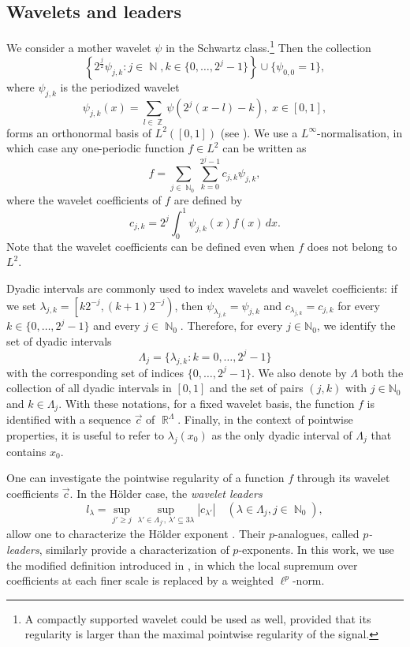 \documentclass[a4paper,11pt,oneside]{article}
\DeclareMathOperator{\R}{\mathbb{R}}
\DeclareMathOperator{\N}{\mathbb{N}}
\DeclareMathOperator{\Z}{\mathbb{Z}}
\newcommand{\coint}[1]{\left[{#1}\right)}
\newcommand{\ccint}[1]{\left[{#1}\right]}
\newcommand{\modu}[1]{\left\vert{#1}\right\vert}
\theoremstyle{definition}
\theoremstyle{plain}
\begin{document}
\subsection{Wavelets and leaders}\label{secWavelet}



We consider a mother wavelet $\psi$ in the Schwartz class.\footnote{A compactly supported wavelet could be used as well, provided that its regularity is larger than the maximal pointwise regularity of the signal.} Then the collection
\[
\left\{2^{\frac{j}{2}}\psi_{j,k} :j\in\N,k\in\{0,\ldots,2^j-1\}\right\}\cup\{\psi_{0,0}=1\},
\]
where $\psi_{j,k}$ is the periodized wavelet
\[
\psi_{j,k}(x)=\sum_{l\in\Z}\psi\left(2^j(x-l)-k\right),\; x\in\ccint{0,1},
\]
forms an orthonormal basis of $L^2(\ccint{0,1})$ (see \cite{LM86,Daubechies:92}). We use a $L^\infty$-normalisation, in which case any one-periodic function $f \in  L^2$ can be written as
\[
f=\sum_{j\in\N_0}\sum_{k=0}^{2^j-1}c_{j,k}\psi_{j,k},
\]
where the wavelet coefficients of $f$ are defined by
\[
c_{j,k}=2^j\int_0^1\psi_{j,k}(x)f(x)\,dx.
\]
Note that the wavelet coefficients can be defined even when $f$ does not belong to $L^2$.

Dyadic intervals are commonly used to index wavelets and wavelet coefficients: if we set \mbox{$\lambda_{j,k}=\coint{k2^{-j},(k+1)2^{-j}}$}, then $\psi_{\lambda_{j,k}}=\psi_{j,k}$ and $c_{\lambda_{j,k}}=c_{j,k}$ for every $k\in\{0,\ldots,2^j-1\}$ and every $j\in\N_0$. Therefore, for every $j\in\mathbb N_0$, we identify the set of dyadic intervals
\[
\Lambda_j=\{\lambda_{j,k}:k=0,\ldots,2^j-1\}
\]
with the corresponding set of indices $\{0,\ldots,2^j-1\}$. We also denote by $\Lambda$ both the collection of all dyadic intervals in $[0,1]$ and the set of pairs $(j,k)$ with $j\in\mathbb N_0$ and $k\in\Lambda_j$.
With these notations, for a fixed wavelet basis, the function $f$ is identified with a sequence $\vec{c}$ of $\R^\Lambda$. Finally, in the context of pointwise properties, it is useful to refer to $\lambda_j(x_0)$ as the only dyadic interval of $\Lambda_j$ that contains $x_0$.

\bigskip



One can investigate the pointwise regularity of a function $f$ through its wavelet coefficients $\vec c$. In the Hölder case, the \textit{wavelet leaders}
\begin{equation}\label{eq:leader}
l_\lambda=\sup_{j'\geq j}\sup_{\lambda'\in\Lambda_{j'},\,\lambda'\subseteq 3\lambda}\modu{c_{\lambda'}}\quad (\lambda\in\Lambda_j,j\in\N_0),
\end{equation}
allow one to characterize the Hölder exponent \cite{jaffard04}. Their $p$-analogues, called \textit{$p$-leaders}, similarly provide a characterization of $p$-exponents. In this work, we use the modified definition introduced in \cite{laurent}, in which the local supremum over coefficients at each finer scale is replaced by a weighted $\ell^p$-norm.
\end{document}
